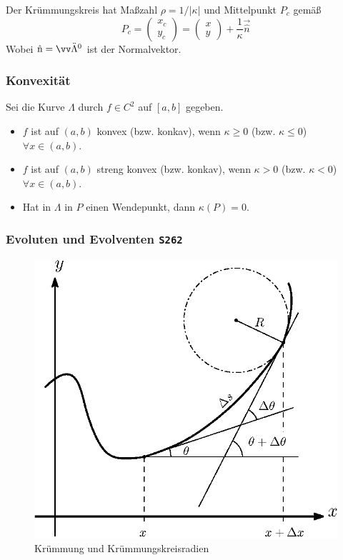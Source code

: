 \documentclass[margin=small, twocolumn]{hsrzf}
\numberwithin{equation}{subsection}
\newcommand{\brpage}[1]{\textcolor{red!70!black}{\small\texttt{S#1}}}
\begin{document}
Der Kr\"ummungskreis hat Ma{\ss}zahl \(\rho = 1/|\kappa|\) und Mittelpunkt \(P_c\) gem\"a\ss
\[
    P_c = \begin{pmatrix} x_c \\ y_c \end{pmatrix} 
    = \begin{pmatrix} x \\ y \end{pmatrix} + \frac{1}{\kappa} \vec{\hat{n}}
\]
Wobei \(\uvec{n} = \vec{\ddot{\Lambda}}^0\) ist der Normalvektor.

\subsubsection{Konvexit\"at}
Sei die Kurve \(\Lambda\) durch \(f \in C^2\) auf \([a,b]\) gegeben.
\begin{itemize}
    \item \(f\) ist auf \((a,b)\) konvex (bzw. konkav), wenn \(\kappa \geq 0\) (bzw. \(\kappa \leq 0\)) \(\forall x \in (a,b)\).
    \item \(f\) ist auf \((a,b)\) streng konvex (bzw. konkav), wenn \(\kappa > 0\) (bzw. \(\kappa < 0\)) \(\forall x \in (a,b)\).
    \item Hat in \(\Lambda\) in \(P\) einen Wendepunkt, dann \(\kappa(P) = 0\).
\end{itemize}

\subsubsection{Evoluten und Evolventen \brpage{262}}


\begin{figure}[h]
\centering
\includegraphics[width=.8\linewidth]{fig/plane-curvature}
\caption{Kr\"ummung und Kr\"ummungskreisradien}
\label{fig:plane-curvature}
\end{figure}
\end{document}
